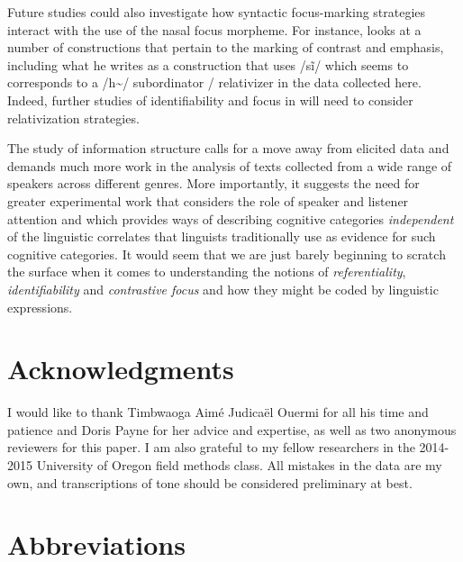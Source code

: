 \documentclass[output=paper]{langsci/langscibook}
\begin{document}
Future studies could also investigate how syntactic focus-marking strategies interact with the use of the nasal focus morpheme. For instance, \citet[445-450]{Kabore1985} looks at a number of constructions that pertain to the marking of contrast and emphasis, including what he writes as a construction that uses /s\~{i}/ which seems to corresponds to a /h\~{\schwa}/ subordinator / relativizer in the data collected here. Indeed, further studies of identifiability and focus in  will need to consider relativization strategies.

The study of information structure calls for a move away from elicited data and demands much more work in the analysis of texts collected from a wide range of speakers across different genres. More importantly, it suggests the need for greater experimental work that considers the role of speaker and listener attention and which provides ways of describing cognitive categories \textit{independent} of the linguistic correlates that linguists traditionally use as evidence for such cognitive categories. It would seem that we are just barely beginning to scratch the surface when it comes to understanding the notions of \textit{referentiality}, \textit{identifiability} and \textit{contrastive focus} and how they might be coded by linguistic expressions.

\section*{\textbf{Acknowledgments}}

I would like to thank Timbwaoga Aimé Judicaël Ouermi for all his time and patience and Doris Payne for her advice and expertise, as well as two anonymous reviewers for this paper. I am also grateful to my fellow researchers in the 2014-2015 University of Oregon field methods class. All mistakes in the data are my own, and transcriptions of tone should be considered preliminary at best.

\section*{Abbreviations}
\end{document}
